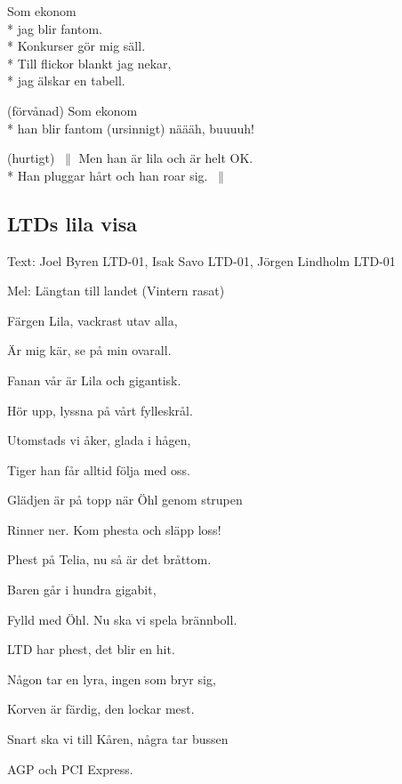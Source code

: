 \begin{SongText}
\begin{Verse}
Som ekonom\\*%
jag blir fantom.\\*%
Konkurser gör mig säll.\\*%
Till flickor blankt jag nekar,\\*%
jag älskar en tabell.
\end{Verse}
\begin{Verse}
(förvånad) Som ekonom\\*%
han blir fantom (ursinnigt) näääh, buuuuh!
\end{Verse}
\begin{Verse}
(hurtigt) $\:\|$ Men han är lila och är helt OK.\\*%
Han pluggar hårt och han roar sig. $\:\|$
\end{Verse}
\end{SongText}

\subsection{\textbf{LTDs lila visa}}

Text: Joel Byren LTD-01, Isak Savo LTD-01,
Jörgen Lindholm LTD-01

Mel: Längtan till landet (Vintern rasat)

Färgen Lila, vackrast utav alla,

Är mig kär, se på min ovarall.

Fanan vår är Lila och gigantisk.

Hör upp, lyssna på vårt fylleskrål.\bigskip

Utomstads vi åker, glada i hågen,

Tiger han får alltid följa med oss.

Glädjen är på topp när Öhl genom strupen

Rinner ner. Kom phesta och släpp loss!\bigskip

Phest på Telia, nu så är det bråttom.

Baren går i hundra gigabit,

Fylld med Öhl. Nu ska vi spela brännboll.

LTD har phest, det blir en hit.\bigskip

Någon tar en lyra, ingen som bryr sig,

Korven är färdig, den lockar mest.

Snart ska vi till Kåren, några tar bussen

AGP och PCI Express.\bigskip

